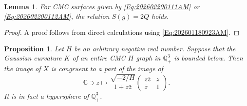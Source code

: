 \documentclass[12pt,reqno]{amsart}
\theoremstyle{plain} %
\newtheorem{lemma}[theorem]{Lemma}
\newtheorem{proposition}[theorem]{Proposition}
\theoremstyle{definition}
\numberwithin{equation}{section}
\newcommand{\qthreep}{\mathbb{Q}^3_+}
\newcommand{\h}{H}%
\begin{document}
\begin{lemma}\label{Lem:202602190936PM}
	For CMC surfaces given by \eqref{Eq:202602200111AM} or \eqref{Eq:202602200112AM}, the relation $S(g) = 2Q$ holds.
\end{lemma}
\begin{proof}
	A proof follows from direct calculations using \eqref{Eq:202601180923AM}.%
\end{proof}
\begin{proposition}\label{prop:negative}
	Let $\h$ be an arbitrary negative real number.
	Suppose that the Gaussian curvature $K$ of an entire CMC $\h$ graph in $\qthreep$ is bounded below.
	Then the image of $X$ is congruent to a part of the image of
	\begin{equation}\label{Eq:202507072027}
		\mathbb{C} \ni z \mapsto \frac{\sqrt{-2/\h}}{1+  z\bar{z}} \begin{pmatrix} z \bar{z} & z \\ \bar{z} & 1 \end{pmatrix}.
	\end{equation}
	It is in fact a hypersphere of $\qthreep$.
\end{proposition}
\end{document}
